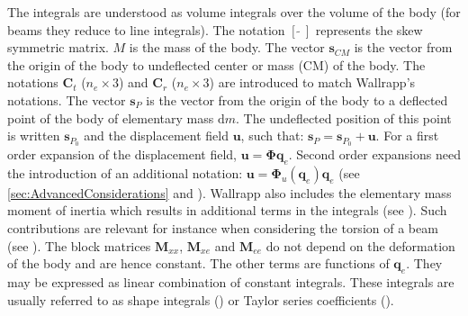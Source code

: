 \documentclass[wes, manuscript]{copernicus}
\renewcommand{\d}{\mathrm{d}}
\renewcommand{\v}[1]{\boldsymbol{#1}}
\newcommand{\m}[1]{\boldsymbol{#1}}
\newcommand{\M} {{\m{M}}}
\newcommand{\s}{\v{s}}
\renewcommand{\d}{\mathrm{d}}
\newcommand{\dm}{\d{m}}
\begin{document}
The integrals are understood as volume integrals over the volume of the body (for beams they reduce to line integrals).
    The notation $[\tilde{\ \ }]$ represents the skew symmetric matrix.
    $M$ is the mass of the body. 
The vector $\v{s}_{CM}$ is the vector from the origin of the body to undeflected center or mass (CM) of the body.
The notations $\m{C}_t$ ($n_e\times 3$) and $\m{C}_r$ ($n_e\times 3$) are introduced to match Wallrapp's notations.
The vector $\s_{P}$ is the vector from the origin of the body to a deflected point of the body of elementary mass $\dm$.
The undeflected position of this point is written $\s_{P_0}$ and the displacement field $\v{u}$, such that:  $\s_{P}=\s_{P_0} + \v{u}$.
For a first order expansion of the displacement field, $\v{u}=\m{\Phi} \v{q}_e$.
Second order expansions need the introduction of an additional notation:  $\v{u}=\m{\Phi}_u(\v{q}_e) \v{q}_e$ (see \autoref{sec:AdvancedConsiderations} and \cite{Wallrapp:1994}).
Wallrapp also includes the elementary mass moment of inertia which results in additional terms in the integrals (see \cite{Wallrapp:1994}).
Such contributions are relevant for instance when considering the torsion of a beam (see \cite{branlard:2019flex}).
The block matrices $\M_{xx}$, $\M_{xe}$ and $\M_{ee}$ do not depend on the deformation of the body and are hence constant.
The other terms are functions of $\v{q}_e$.
They may be expressed as linear combination of constant integrals.
These integrals are usually referred to as shape integrals (\cite{shabana:book}) or Taylor series coefficients (\cite{Wallrapp:1994}). 
\end{document}
